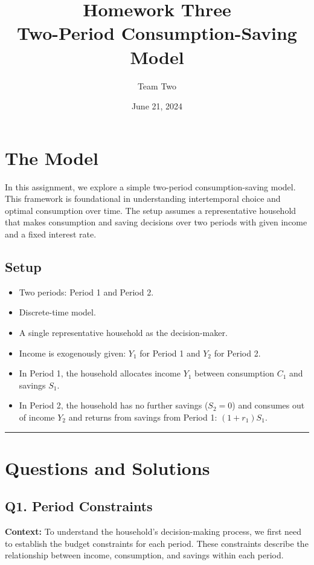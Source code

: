 \documentclass{article}
\begin{document}
\title{Homework Three \\
\large Two-Period Consumption-Saving Model}
\author{Team Two}
\date{June 21, 2024}
\maketitle

\section{The Model}

In this assignment, we explore a simple two-period consumption-saving model. This framework is foundational in understanding intertemporal choice and optimal consumption over time. The setup assumes a representative household that makes consumption and saving decisions over two periods with given income and a fixed interest rate.

\subsection*{Setup}
\begin{itemize}
    \item Two periods: Period 1 and Period 2.
    \item Discrete-time model.
    \item A single representative household as the decision-maker.
    \item Income is exogenously given: \(Y_1\) for Period 1 and \(Y_2\) for Period 2.
    \item In Period 1, the household allocates income \(Y_1\) between consumption \(C_1\) and savings \(S_1\).
    \item In Period 2, the household has no further savings (\(S_2 = 0\)) and consumes out of income \(Y_2\) and returns from savings from Period 1: \((1 + r_1)S_1\).
\end{itemize}

\noindent\rule{\linewidth}{1pt}

\section{Questions and Solutions}

\subsection*{Q1. Period Constraints}

\textbf{Context:} To understand the household's decision-making process, we first need to establish the budget constraints for each period. These constraints describe the relationship between income, consumption, and savings within each period.
\end{document}
